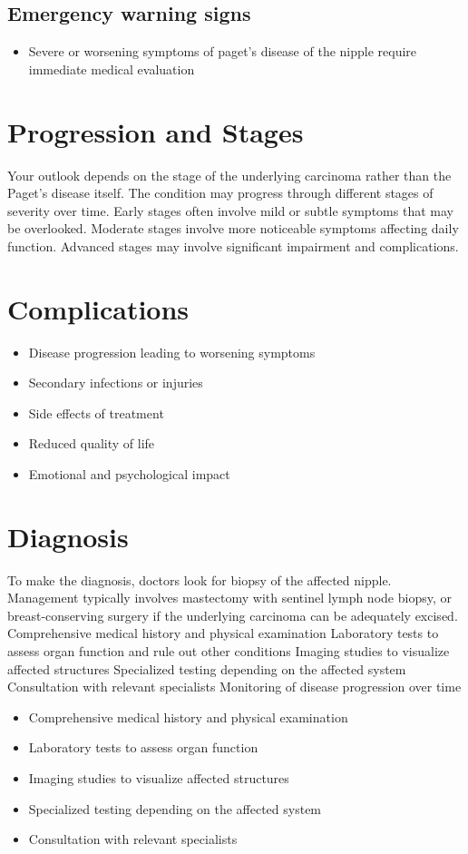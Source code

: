 \subsection{Emergency warning signs}
\begin{itemize}[noitemsep]
  \item Severe or worsening symptoms of paget's disease of the nipple require immediate medical evaluation
\end{itemize}
\section{Progression and Stages}
Your outlook depends on the stage of the underlying carcinoma rather than the Paget's disease itself. The condition may progress through different stages of severity over time. Early stages often involve mild or subtle symptoms that may be overlooked. Moderate stages involve more noticeable symptoms affecting daily function. Advanced stages may involve significant impairment and complications.
\section{Complications}
\begin{itemize}[noitemsep]
  \item Disease progression leading to worsening symptoms
  \item Secondary infections or injuries
  \item Side effects of treatment
  \item Reduced quality of life
  \item Emotional and psychological impact
\end{itemize}
\section{Diagnosis}
To make the diagnosis, doctors look for biopsy of the affected nipple. Management typically involves mastectomy with sentinel lymph node biopsy, or breast-conserving surgery if the underlying carcinoma can be adequately excised. Comprehensive medical history and physical examination Laboratory tests to assess organ function and rule out other conditions Imaging studies to visualize affected structures Specialized testing depending on the affected system Consultation with relevant specialists Monitoring of disease progression over time

\begin{itemize}[noitemsep]
  \item Comprehensive medical history and physical examination
  \item Laboratory tests to assess organ function
  \item Imaging studies to visualize affected structures
  \item Specialized testing depending on the affected system
  \item Consultation with relevant specialists
\end{itemize}
